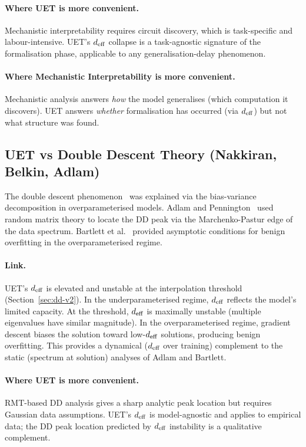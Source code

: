 \paragraph{Where UET is more convenient.}
Mechanistic interpretability requires circuit discovery, which is task-specific
and labour-intensive.
UET's $d_{\mathrm{eff}}$ collapse is a task-agnostic signature of the formalisation phase,
applicable to any generalisation-delay phenomenon.

\paragraph{Where Mechanistic Interpretability is more convenient.}
Mechanistic analysis answers \emph{how} the model generalises (which computation
it discovers).
UET answers \emph{whether} formalisation has occurred (via $d_{\mathrm{eff}}$) but not what
structure was found.

\subsection{UET vs Double Descent Theory (Nakkiran, Belkin, Adlam)}
\label{sec:vs-dd}

The double descent phenomenon~\citep{nakkiran2020dd} was explained via the
bias-variance decomposition in overparameterised models.
Adlam and Pennington~\citep{adlam2020ntk} used random matrix theory to locate the
DD peak via the Marchenko-Pastur edge of the data spectrum.
Bartlett et al.~\citep{bartlett2020benign} provided asymptotic conditions for
benign overfitting in the overparameterised regime.

\paragraph{Link.}
UET's $d_{\mathrm{eff}}$ is elevated and unstable at the interpolation threshold
(Section~\ref{sec:dd-v2}).
In the underparameterised regime, $d_{\mathrm{eff}}$ reflects the model's limited capacity.
At the threshold, $d_{\mathrm{eff}}$ is maximally unstable (multiple eigenvalues have similar
magnitude).
In the overparameterised regime, gradient descent biases the solution toward
low-$d_{\mathrm{eff}}$ solutions, producing benign overfitting.
This provides a dynamical ($d_{\mathrm{eff}}$ over training) complement to the static
(spectrum at solution) analyses of Adlam and Bartlett.

\paragraph{Where UET is more convenient.}
RMT-based DD analysis gives a sharp analytic peak location but requires
Gaussian data assumptions.
UET's $d_{\mathrm{eff}}$ is model-agnostic and applies to empirical data;
the DD peak location predicted by $d_{\mathrm{eff}}$ instability is a qualitative complement.

